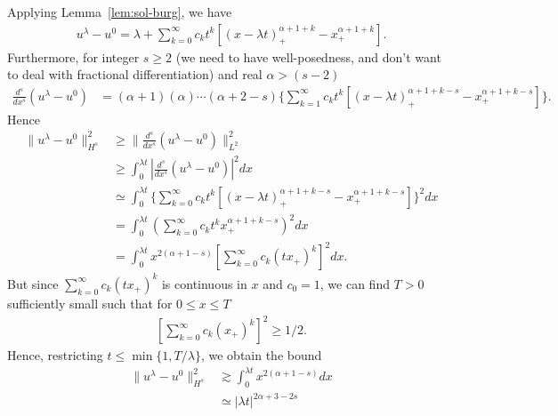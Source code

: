 \documentclass[12pt,reqno]{amsart}
\numberwithin{equation}{section}  %
\numberwithin{figure}{section}
\begin{document}
%
%
%
%
%
Applying Lemma~\ref{lem:sol-burg}, we have
%
%
\begin{equation*}
\begin{split}
u^{\lambda} - u^{0} = \lambda  + \sum_{k=0}^{\infty}c_{k}t^{k}\left[ (x - \lambda
  t)^{\alpha + 1 + k}_{+} - x_{+}^{\alpha + 1 + k}
  \right].
\end{split}
\end{equation*}
%
%
Furthermore, for integer $s \ge 2$ (we need to have well-posedness, and don't want to deal with fractional differentiation) and real $\alpha > (s-2)$
%
%
\begin{equation*}
\begin{split}
\frac{d^{s}}{dx^{s}}(u^{\lambda} - u^{0}) & = (\alpha + 1)(\alpha) \cdots (\alpha
+ 2 -s)\{\sum_{k=1}^{\infty}c_{k}t^{k}\left[ (x - \lambda t)^{\alpha + 1 + k -s}_{+} -
  x_{+}^{\alpha + 1 + k -s} \right] \}.
\end{split}
\end{equation*}
%
%
Hence
%
%
\begin{equation*}
\begin{split}
\| u^{\lambda} - u^{0} \|_{H^{s}}^{2} 
& \ge \| \frac{d^{s}}{dx^{s}}(u^{\lambda} - u^{0}) \|_{L^{2}}^{2}
\\
& \ge \int_{0}^{\lambda t} | \frac{d^{s}}{dx^{s}}(u^{\lambda} - u^{0}) |^{2} dx
\\
& \simeq \int_{0}^{\lambda t}
\{ \sum_{k=0}^{\infty}c_{k}t^{k}\left[ (x - \lambda t)^{\alpha + 1 + k -s}_{+} -
  x_{+}^{\alpha + 1 + k -s} \right] \}^{2}dx
\\
& = \int_{0}^{\lambda t}
( \sum_{k=0}^{\infty}c_{k}t^{k} x_{+}^{\alpha + 1 + k -s} )^{2}dx
\\
& =\int_{0}^{\lambda t}
x^{2(\alpha + 1 -s)} [ \sum_{k=0}^{\infty}c_{k}(tx_{+})^{k} ]^{2}dx.
\end{split}
\end{equation*}
%
But since $\sum_{k=0}^{\infty}c_{k}(tx_{+})^{k}$ is continuous in
$x$ and $c_{0} =1$, we can find $T > 0$ sufficiently small such that for $0 \le x \le T$ 
%
%
\begin{equation*}
\begin{split}
  [\sum_{k=0}^{\infty}c_{k}(x_{+})^{k}]^{2} \ge 1/2. 
\end{split}
\end{equation*}
%
%
Hence, restricting $t \le \min \{1, T/\lambda \}$, we obtain the bound
%
%
%
\begin{equation*}
\begin{split}
\| u^{\lambda} - u^{0} \|_{H^{s}}^{2} 
& \gtrsim \int_{0}^{\lambda t} x^{2(\alpha + 1 -s)} dx 
\\
& \simeq  | \lambda t |^{2 \alpha + 3 -2s}
\end{split}
\end{equation*}
\end{document}
